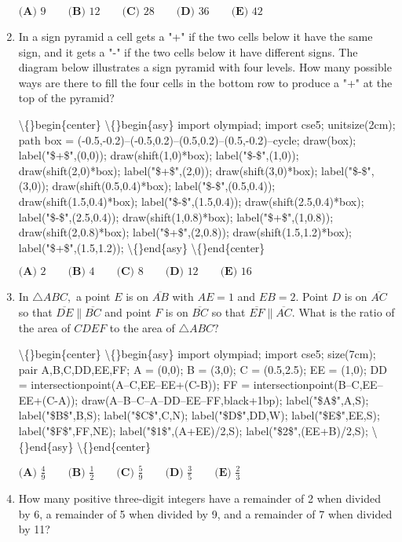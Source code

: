 \documentclass{article}
\begin{document}
\begin{enumerate}[label=\arabic*., itemsep=0.5em]
\(\textbf{(A) }9\qquad\textbf{(B) }12\qquad\textbf{(C) }28\qquad\textbf{(D) }36\qquad\textbf{(E) }42\)\par \vspace{0.5em}\item In a sign pyramid a cell gets a "+" if the two cells below it have the same sign, and it gets a "-" if the two cells below it have different signs. The diagram below illustrates a sign pyramid with four levels. How many possible ways are there to fill the four cells in the bottom row to produce a "+" at the top of the pyramid?


\textbackslash\{\}begin\{center\}
\textbackslash\{\}begin\{asy\}
import olympiad;
import cse5;
unitsize(2cm);
path box = (-0.5,-0.2)--(-0.5,0.2)--(0.5,0.2)--(0.5,-0.2)--cycle;
draw(box); label("\$+\$",(0,0));
draw(shift(1,0)*box); label("\$-\$",(1,0));
draw(shift(2,0)*box); label("\$+\$",(2,0));
draw(shift(3,0)*box); label("\$-\$",(3,0));
draw(shift(0.5,0.4)*box); label("\$-\$",(0.5,0.4));
draw(shift(1.5,0.4)*box); label("\$-\$",(1.5,0.4));
draw(shift(2.5,0.4)*box); label("\$-\$",(2.5,0.4));
draw(shift(1,0.8)*box); label("\$+\$",(1,0.8));
draw(shift(2,0.8)*box); label("\$+\$",(2,0.8));
draw(shift(1.5,1.2)*box); label("\$+\$",(1.5,1.2));
\textbackslash\{\}end\{asy\}
\textbackslash\{\}end\{center\}


\(\textbf{(A) } 2 \qquad \textbf{(B) } 4 \qquad \textbf{(C) } 8 \qquad \textbf{(D) } 12 \qquad \textbf{(E) } 16\)\par \vspace{0.5em}\item In \(\triangle ABC,\) a point \(E\) is on \(\overline{AB}\) with \(AE=1\) and \(EB=2.\) Point \(D\) is on \(\overline{AC}\) so that \(\overline{DE} \parallel \overline{BC}\) and point \(F\) is on \(\overline{BC}\) so that \(\overline{EF} \parallel \overline{AC}.\) What is the ratio of the area of \(CDEF\) to the area of \(\triangle ABC?\)


\textbackslash\{\}begin\{center\}
\textbackslash\{\}begin\{asy\}
import olympiad;
import cse5;
size(7cm);
pair A,B,C,DD,EE,FF;
A = (0,0); B = (3,0); C = (0.5,2.5);
EE = (1,0);
DD = intersectionpoint(A--C,EE--EE+(C-B));
FF = intersectionpoint(B--C,EE--EE+(C-A));
draw(A--B--C--A--DD--EE--FF,black+1bp);
label("\$A\$",A,S); label("\$B\$",B,S); label("\$C\$",C,N);
label("\$D\$",DD,W); label("\$E\$",EE,S); label("\$F\$",FF,NE);
label("\$1\$",(A+EE)/2,S); label("\$2\$",(EE+B)/2,S);
\textbackslash\{\}end\{asy\}
\textbackslash\{\}end\{center\}


\(\textbf{(A) } \frac{4}{9} \qquad \textbf{(B) } \frac{1}{2} \qquad \textbf{(C) } \frac{5}{9} \qquad \textbf{(D) } \frac{3}{5} \qquad \textbf{(E) } \frac{2}{3}\)\par \vspace{0.5em}\item How many positive three-digit integers have a remainder of 2 when divided by 6, a remainder of 5 when divided by 9, and a remainder of 7 when divided by 11?


\end{enumerate}
\end{document}
